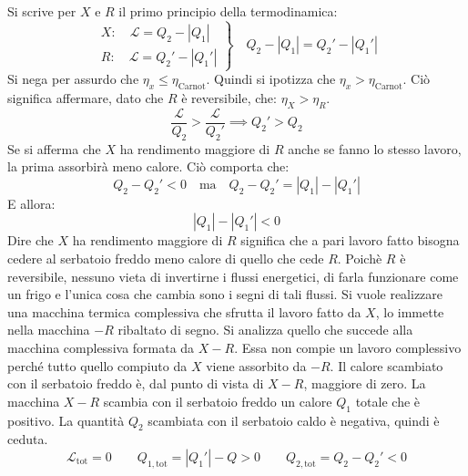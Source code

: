 \documentclass[10pt,a4paper]{book}
\begin{document}
\begin{figure}[htpb]
\end{figure}
\FloatBarrier
Si scrive per $X$ e $R$ il primo principio della termodinamica:
\[
	\left. \begin{array}{l}
	 	X:\quad \mathcal{L} = Q_2 - |Q_1|  \\
		R:\quad \mathcal{L} = Q_2' - |Q_1'|
	\end{array} \right\}
	\quad Q_2 - |Q_1| = Q_2' - |Q_1'|
\]
Si nega per assurdo che $\eta_x \le \eta_{\text{Carnot}}$. Quindi si ipotizza che $\eta_x > \eta_{\text{Carnot}}$. Ciò significa affermare, dato che $R$ è reversibile, che: $\eta_X > \eta_R$.
\[
	\frac{\mathcal{L} }{Q_2 } > \frac{\mathcal{L} }{Q_2'} \implies Q_2' > Q_2
\]
Se si afferma che $X$ ha rendimento maggiore di $R$ anche se fanno lo stesso lavoro, la prima assorbirà meno calore. Ciò comporta che:
\[
	Q_2-Q_2' < 0 \quad \text{ma} \quad Q_2-Q_2' = |Q_1| - |Q_1'|
\]
E allora:
\[
	|Q_1| - |Q_1'| < 0
\]
Dire che $X$ ha rendimento maggiore di $R$ significa che a pari lavoro fatto bisogna cedere al serbatoio freddo meno calore di quello che cede $R$. Poichè $R$ è reversibile, nessuno vieta di invertirne i flussi energetici, di farla funzionare come un frigo e l'unica cosa che cambia sono i segni di tali flussi. Si vuole realizzare una macchina termica complessiva che sfrutta il lavoro fatto da $X$, lo immette nella macchina $-R$ ribaltato di segno. Si analizza quello che succede alla macchina complessiva formata da $X - R$. Essa non compie un lavoro complessivo perché tutto quello compiuto da $X$ viene assorbito da $-R$. Il calore scambiato con il serbatoio freddo è, dal punto di vista di $X-R$, maggiore di zero. La macchina $X-R$ scambia con il serbatoio freddo un calore $Q_1$ totale che è positivo. La quantità $Q_2$ scambiata con il serbatoio caldo è negativa, quindi è ceduta.
\[
	\mathcal{L}_{\text{tot} } = 0 \qquad Q_{1,\text{tot} } = |Q_1'| - Q > 0 \qquad Q_{2,\text{tot} } = Q_2 - Q_2' < 0
\]
\end{document}
